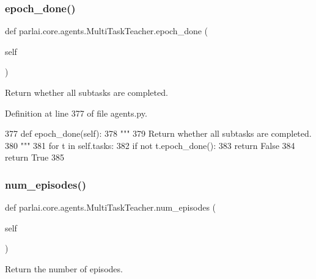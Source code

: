 \subsubsection{\texorpdfstring{epoch\+\_\+done()}{epoch\_done()}}
{\footnotesize\ttfamily def parlai.\+core.\+agents.\+Multi\+Task\+Teacher.\+epoch\+\_\+done (\begin{DoxyParamCaption}\item[{}]{self }\end{DoxyParamCaption})}

\begin{DoxyVerb}Return whether all subtasks are completed.
\end{DoxyVerb}
 

Definition at line 377 of file agents.\+py.


\begin{DoxyCode}
377     \textcolor{keyword}{def }epoch\_done(self):
378         \textcolor{stringliteral}{"""}
379 \textcolor{stringliteral}{        Return whether all subtasks are completed.}
380 \textcolor{stringliteral}{        """}
381         \textcolor{keywordflow}{for} t \textcolor{keywordflow}{in} self.tasks:
382             \textcolor{keywordflow}{if} \textcolor{keywordflow}{not} t.epoch\_done():
383                 \textcolor{keywordflow}{return} \textcolor{keyword}{False}
384         \textcolor{keywordflow}{return} \textcolor{keyword}{True}
385 
\end{DoxyCode}
\mbox{\label{classparlai_1_1core_1_1agents_1_1MultiTaskTeacher_ac292d1cb86a3769c352e2d3658f324d2}} 
\subsubsection{\texorpdfstring{num\+\_\+episodes()}{num\_episodes()}}
{\footnotesize\ttfamily def parlai.\+core.\+agents.\+Multi\+Task\+Teacher.\+num\+\_\+episodes (\begin{DoxyParamCaption}\item[{}]{self }\end{DoxyParamCaption})}

\begin{DoxyVerb}Return the number of episodes.
\end{DoxyVerb}
 

